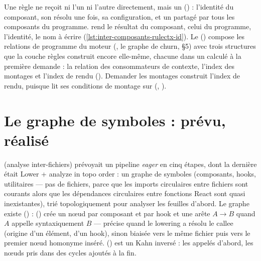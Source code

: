 Une règle ne reçoit ni l'un ni l'autre directement, mais un 
() : l'identité du composant, son 
résolu une fois, sa configuration, et un  partagé par tous les composants du
programme.  rend le résultat du composant,  celui du
programme,  l'identité,  le nom à écrire
(\cref{lst:inter-composants-rulectx-id}). Le 
() compose les relations de programme du moteur
(, le graphe de churn,  §5) avec trois structures que la couche
règles construit encore elle-même, chacune dans un  calculé à la première
demande : la relation des consommateurs de contexte, l'index des montages et l'index de rendu
(). Demander les montages construit l'index de rendu, puisque
 lit ses conditions de montage sur 
(, ).

\section{Le graphe de symboles : prévu, réalisé}
\label{sec:inter-composants-symboles}

 (analyse inter-fichiers) prévoyait un pipeline \emph{eager} en cinq étapes, dont la
dernière était \og Lower + analyze in topo order\fg{} : un graphe de symboles (composants, hooks,
utilitaires --- pas de fichiers, parce que les imports circulaires entre fichiers sont courants
alors que les dépendances circulaires entre fonctions React sont quasi inexistantes), trié
topologiquement pour analyser les feuilles d'abord. Le graphe existe
() :  ()
crée un nœud par composant et par hook et une arête $A \to B$ quand $A$ appelle syntaxiquement
$B$ --- précise quand le lowering a résolu le callee (origine d'un élément,
 d'un hook), sinon biaisée vers le même fichier puis vers le premier nœud
homonyme inséré.  () est un Kahn
inversé : les appelés d'abord, les nœuds pris dans des cycles ajoutés à la fin.

